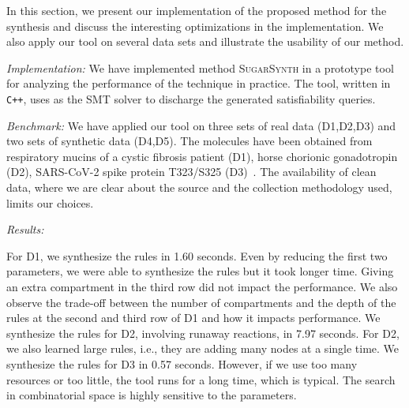 In this section, we  present our implementation of the proposed method for the synthesis
and discuss the interesting optimizations in the implementation.
%
We also apply our tool on several data sets and illustrate the usability of our method.

{\em Implementation:} 
We have implemented method \textsc{SugarSynth} in a prototype tool {\ourtool} for
analyzing the performance of the technique in practice.
%
The tool, written in {\tt C++}, uses {\zthree}\cite{z3} as the SMT solver
to discharge the generated satisfiability queries.
%


{\em Benchmark: }
We have applied our tool on three sets of real data (D1,D2,D3) and two sets of synthetic data (D4,D5). The molecules have been obtained from
respiratory mucins of a cystic fibrosis patient (D1),
horse chorionic gonadotropin (D2), SARS-CoV-2 spike protein T323/S325 (D3)~\cite{Jaiman2018,SarsCov2}.
The availability of clean data, where we are clear about the source and the collection
methodology used, limits our choices.




{\em Results:} %

For D1, we synthesize the rules in 1.60 seconds. Even by reducing the first two parameters, we were able to synthesize the rules but it took longer time.
Giving an extra compartment in the third row did not impact the performance.  We also observe the trade-off between the number of compartments
and the depth of the rules at the second and third row of D1 and how it impacts performance.
We synthesize the rules for D2, involving runaway reactions,  in 7.97 seconds.
For D2, we also learned large rules, i.e., they are adding many nodes at a single time.
We synthesize the rules for D3 in 0.57 seconds. 
However, if we use too many resources or too little, the tool runs for a long time,
which is typical. The search in combinatorial space is highly sensitive to the parameters.

